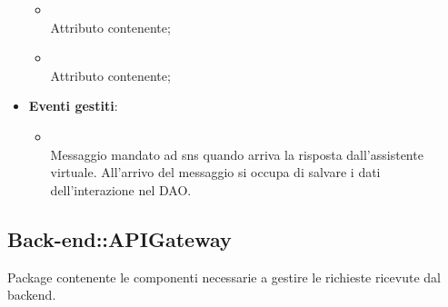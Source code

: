 \begin{itemize}
	\begin{itemize}
		\item[]  \\
		Attributo contenente;
		\item[]  \\
		Attributo contenente;
	\end{itemize}
	\item \textbf{Eventi gestiti}:
	\begin{itemize}
\item {} \\ Messaggio mandato ad sns quando arriva la risposta dall'assistente virtuale. All'arrivo del messaggio si occupa di salvare i dati dell'interazione nel DAO.	\end{itemize}
\end{itemize}

\subsection{Back-end::APIGateway}
Package contenente le componenti necessarie a gestire le richieste ricevute dal backend.
